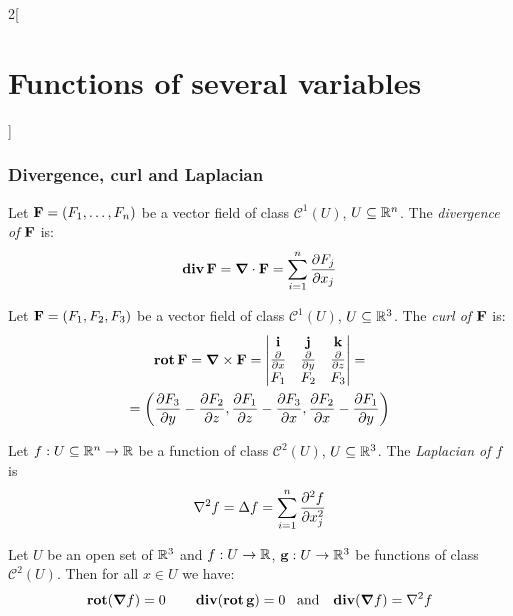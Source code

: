 \documentclass[../../../main.tex]{subfiles}
\begin{document}
\begin{multicols}{2}[\section{Functions of several variables}]
  \subsubsection{Divergence, curl and Laplacian}
  \begin{definition}
    Let $\boldsymbol{\mathrm{F}}=(F_1,\ldots, F_n)$ be a vector field of class $\mathcal{C}^1(U)$, $U\subseteq\mathbb{R}^n$. The \textit{divergence of $\boldsymbol{\mathrm{F}}$} is: $$\operatorname{\boldsymbol{\mathrm{div}}}\boldsymbol{\mathrm{F}}=\grad\cdot\boldsymbol{\mathrm{F}}=\sum_{i=1}^n\frac{\partial F_j}{\partial x_j}$$
  \end{definition}
  \begin{definition}
    Let $\boldsymbol{\mathrm{F}}=(F_1,F_2,F_3)$ be a vector field of class $\mathcal{C}^1(U)$, $U\subseteq\mathbb{R}^3$. The \textit{curl of $\boldsymbol{\mathrm{F}}$} is:
    \begin{multline*}
      \operatorname{\boldsymbol{\mathrm{rot}}}\boldsymbol{\mathrm{F}}=\grad\times\boldsymbol{\mathrm{F}}=
      \begin{vmatrix}
        \boldsymbol{\mathrm{i}}          & \boldsymbol{\mathrm{j}}          & \boldsymbol{\mathrm{k}}          \\
        \frac{\partial}{\partial x} & \frac{\partial}{\partial y} & \frac{\partial}{\partial z} \\
        F_1                         & F_2                         & F_3                         \\
      \end{vmatrix}=\\=\left(\frac{\partial F_3}{\partial y}-\frac{\partial F_2}{\partial z},\frac{\partial F_1}{\partial z}-\frac{\partial F_3}{\partial x},\frac{\partial F_2}{\partial x}-\frac{\partial F_1}{\partial y}\right)
    \end{multline*}
  \end{definition}
  \begin{definition}
    Let $f:U\subseteq\mathbb{R}^n\rightarrow\mathbb{R} $ be a function of class $\mathcal{C}^2(U)$, $U\subseteq\mathbb{R}^3$. The \textit{Laplacian of $f$} is $$\laplacian f=\Delta f=\sum_{i=1}^n\frac{\partial^2 f}{\partial x_j^2}$$
  \end{definition}
  \begin{prop}
    Let $U$ be an open set of $\mathbb{R}^3$ and $f:U\rightarrow\mathbb{R} $, $\boldsymbol{\mathrm{g}}:U\rightarrow\mathbb{R}^3$ be functions of class $\mathcal{C}^2(U)$. Then for all $x\in U$ we have: $$\rot(\grad f)=0\qquad\div(\rot\vectorfunction{g})=0\;\;\;\text{and}\;\;\;\div(\grad f)=\laplacian f$$
  \end{prop}

\end{multicols}
\end{document}
